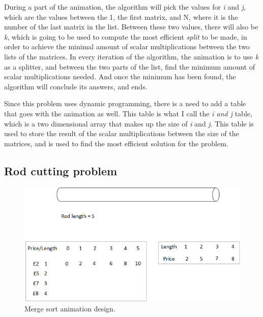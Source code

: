 During a part of the animation, the algorithm will pick the values for \textit{i} and \textit{j}, which are the values between the 1, the first matrix, and N, where it is the number of the last matrix in the list. Between these two values, there will also be \textit{k}, which is going to be used to compute the most efficient \textit{split} to be made, in order to achieve the minimal amount of scalar multiplications between the two lists of the matrices. In every iteration of the algorithm, the animation is to use \textit{k} as a splitter, and between the two parts of the list, find the minimum amount of scalar multiplications needed. And once the minimum has been found, the algorithm will conclude its answers, and ends.

Since this problem uses dynamic programming, there is a need to add a table that goes with the animation as well. This table is what I call the \textit{i and j} table, which is a two dimensional array that makes up the size of \textit{i} and \textit{j}. This table is used to store the result of the scalar multiplications between the size of the matrices, and is used to find the most efficient solution for the problem. 

\newpage



\subsection{Rod cutting problem}

\begin{figure}[H]
\centering
\includegraphics[scale=0.9]{images/report_images/animationDesignRodCuttingProblem.png}
\caption{Merge sort animation design.}
\label{animationDesignRodCuttingProblem}
\end{figure}

